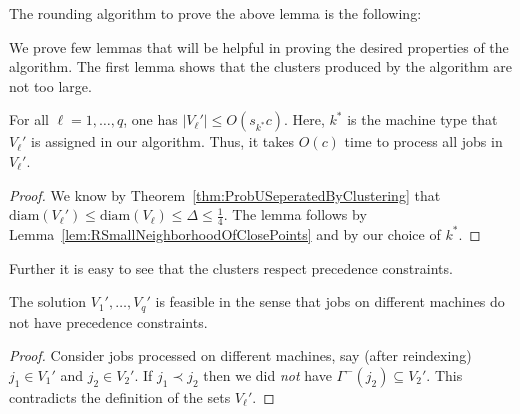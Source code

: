   
  The rounding algorithm to prove the above lemma is the following:
  
  \begin{center}
  \end{center}
  
  We prove few lemmas that will be helpful in proving the desired properties of the algorithm.
  The first lemma shows that the clusters produced by the algorithm are not too large.
  
  \begin{lemma}
      \label{lem:RClusterSize}
  For all $\ell=1,\ldots,q$, one has $|V_{\ell}'| \leq O(s_{k^*}c)$. Here, $k^*$ is the machine type that $V_{\ell}'$ is assigned in our algorithm. Thus, it takes $O(c)$ time to process all jobs in $V_{\ell}'$. 
  \end{lemma}
  \begin{proof}
    We know by Theorem~\ref{thm:ProbUSeperatedByClustering} that $\textrm{diam}(V_{\ell}') \leq \textrm{diam}(V_{\ell}) \leq \Delta \le \frac{1}{4}$.
    The lemma follows by Lemma~\ref{lem:RSmallNeighborhoodOfClosePoints} and by our choice of $k^*$. 
  \end{proof}
  
  Further it is easy to see that the clusters respect precedence constraints.
  \begin{lemma}
  \label{lem:ClusterIndependence}
  The solution $V_{1}',\ldots,V_{q}'$ is feasible in the sense that jobs on different machines do not have precedence constraints.
  \end{lemma}
  \begin{proof}
    Consider jobs processed on different machines, say (after reindexing) $j_1 \in V_{1}'$ and $j_2 \in V_2'$.
     If $j_1 \prec j_2$ then we did \emph{not} have $\Gamma^-(j_2) \subseteq V_2'$. This contradicts
    the definition of the sets $V_{\ell}'$.
  \end{proof}
  
